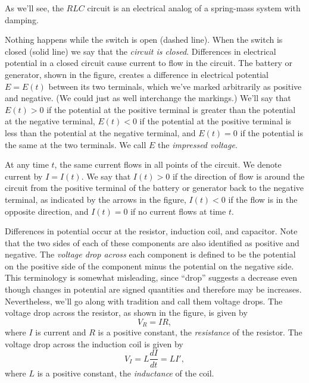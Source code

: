 \documentclass{ximera}
\begin{document}

As we'll see, the $RLC$
circuit is an electrical analog of a spring-mass system with
damping.

Nothing happens while the switch is open (dashed line). When the
switch is closed (solid line) we say that the \textit{circuit is closed}. Differences in electrical potential in a closed circuit
cause current to flow in the circuit. The battery or generator, shown in the figure,
 creates a difference in electrical potential
$E=E(t)$ between its two terminals, which we've marked arbitrarily as
positive and negative. (We could just as well interchange the
markings.) We'll say that $E(t)>0$ if the potential at the positive
terminal is greater than the potential at the negative terminal,
$E(t)<0$ if the potential at the positive terminal is less than the
potential at the negative terminal, and $E(t)=0$ if the potential is
the same at the two terminals. We call $E$ the \textit{impressed
voltage}.

At any  time $t$, the same current flows in all points of the
circuit. We denote current by $I=I(t)$. We say that $I(t)>0$ if the
direction of flow is around the circuit from the positive terminal of
the battery or generator back to the negative terminal, as indicated
by the arrows in the figure,   $I(t)<0$ if the flow is in the
opposite direction, and $I(t)=0$ if no current flows at time $t$.

Differences in potential occur at the resistor, induction coil, and
capacitor. Note that the two sides of each
of these components are also identified as positive and negative. The
\textit{voltage drop across}  each component is defined to be the
potential on the positive side of the component minus the potential on
the negative side. This terminology is somewhat misleading, since
``drop'' suggests a decrease even though changes in potential are
signed quantities and therefore may be increases. Nevertheless,
we'll go along with tradition and call them voltage drops.
The voltage drop across the resistor, as shown in the figure, is given
by
\begin{equation} \label{eq:6.3.1}
V_R=IR,
\end{equation}
where $I$ is current and $R$ is a positive constant, the \textit{resistance} of the resistor. The voltage drop across the induction
coil is given by
\begin{equation} \label{eq:6.3.2}
V_I=L\frac{dI}{dt}=LI',
\end{equation}
where $L$ is a positive constant, the \textit{inductance} of the coil.
\end{document}
